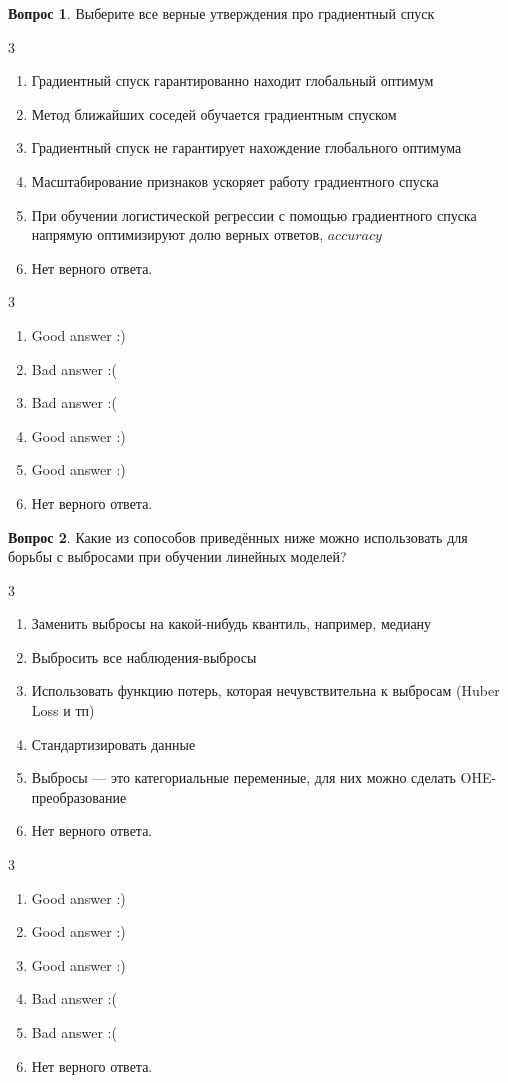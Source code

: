 \documentclass[12pt]{article}
\newenvironment{answerlist}[1][3]{
\begin{multicols}{#1}

\begin{enumerate}[label=\fbox{\emph{\Alph*}},ref=\emph{\alph*}]
}
{
\item Нет верного ответа.
\end{enumerate}
\end{multicols}
}
\theoremstyle{definition}
\newtheorem{question}{Вопрос}
\begin{document}
\begin{question}
Выберите все верные утверждения про градиентный спуск
\begin{answerlist}
   \item  Градиентный спуск гарантированно находит глобальный оптимум
   \item  Метод ближайших соседей обучается градиентным спуском
   \item  Градиентный спуск не гарантирует нахождение глобального оптимума
   \item  Масштабирование признаков ускоряет работу градиентного спуска
   \item  При обучении логистической регрессии с помощью градиентного спуска напрямую оптимизируют долю верных ответов, $accuracy$
\end{answerlist}
\end{question}

\begin{solution}
\begin{answerlist}
  \item Good answer :)
  \item Bad answer :(
  \item Bad answer :(
  \item Good answer :)
  \item Good answer :)
\end{answerlist}
\end{solution}


\begin{question}
Какие из сопособов приведённых ниже можно использовать для борьбы с выбросами при обучении линейных моделей? 
\begin{answerlist}
   \item Заменить выбросы на какой-нибудь квантиль, например, медиану
   \item Выбросить все наблюдения-выбросы
   \item Использовать функцию потерь, которая нечувствительна к выбросам (Huber Loss и тп)
   \item Стандартизировать данные
   \item Выбросы --- это категориальные переменные, для них можно сделать OHE-преобразование
\end{answerlist}
\end{question}

\begin{solution}
\begin{answerlist}
  \item Good answer :)
  \item Good answer :)
  \item Good answer :)
  \item Bad answer :(
  \item Bad answer :(
\end{answerlist}
\end{solution}
\end{document}
